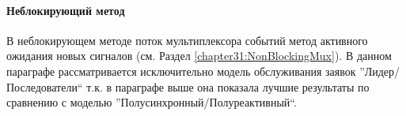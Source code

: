\begin{table}[!h]
\caption{Основные показатели временной задержки на передачу данных между процессами для метода, использующего разделяемую память для передачи данных, неблокирующий мультиплексор в разделяемой памяти и модель ''Лидер/Последователи`` при обслуживании заявок}\label{chapter41:TableBlockingLF}
\centering
{}
\end{table}

\paragraph{Неблокирующий метод}

В неблокирующем методе поток мультиплексора событий метод активного ожидания новых сигналов (см. Раздел \ref{chapter31:NonBlockingMux}). В данном параграфе рассматривается исключительно модель обслуживания заявок ''Лидер/Последователи`` т.к. в параграфе выше она показала лучшие результаты по сравнению с моделью ''Полусинхронный/Полуреактивный``.

